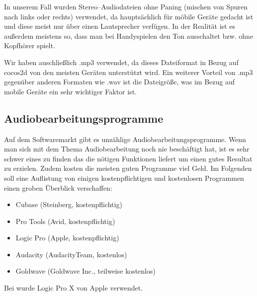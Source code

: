 In unserem Fall wurden Stereo--Audiodateien ohne Paning (mischen von Spuren nach links oder rechts) verwendet, da \gamename hauptsächlich für möbile Geräte gedacht ist und diese meist nur über einen Lautsprecher verfügen. In der Realität ist es außerdem meistens so, dass man bei Handyspielen den Ton ausschaltet bzw. ohne Kopfhörer spielt.

Wir haben auschließlich .mp3 verwendet, da dieses Dateiformat in Bezug auf cocos2d von den meisten Geräten unterstützt wird. Ein weiterer Vorteil von .mp3 gegenüber anderen Formaten wie .wav ist die Dateigröße, was im Bezug auf mobile Geräte ein sehr wichtiger Faktor ist.


\subsection{Audiobearbeitungsprogramme}
Auf dem Softwaremarkt gibt es unzählige Audiobearbeitungsprogramme. Wenn man sich mit dem Thema Audiobearbeitung noch nie beschäftigt hat, ist es sehr schwer eines zu finden das die nötigen Funktionen liefert um einen gutes Resultat zu erzielen. Zudem kosten die meisten guten Programme viel Geld. Im Folgenden soll eine Auflistung von einigen kostenpflichtigen und kostenlosen Programmen einen groben Überblick verschaffen:

\begin{itemize}
 \item Cubase (Steinberg, kostenpflichtig)
 \item Pro Tools (Avid, kostenpflichtig)
 \item Logic Pro (Apple, kostenpflichtig)
 \item Audacity (AudacityTeam, kostenlos)
 \item Goldwave (Goldwave Inc., teilweise kostenlos)
 \end{itemize} 

Bei \gamename wurde Logic Pro X von Apple verwendet.
